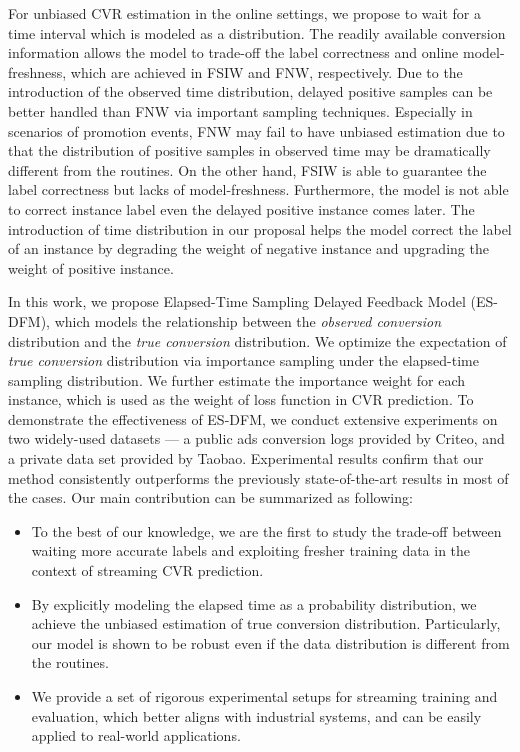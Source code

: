 \documentclass[letterpaper]{article} %
\newcommand{\mus}{Taobao}
\newcommand{\modelname}{Elapsed-Time Sampling Delayed Feedback Model}
\newcommand{\modelnameabb}{ES-DFM}
\begin{document}
For unbiased CVR estimation in the online settings, we propose to wait for a time interval which is modeled as a distribution. The readily available conversion information allows the model to trade-off the label correctness and online model-freshness, which are achieved in FSIW and FNW, respectively. Due to the introduction of the observed time distribution, delayed positive samples can be better handled than FNW via important sampling techniques. Especially in scenarios of promotion events, FNW may fail to have unbiased estimation due to that the distribution of positive samples in observed time may be dramatically different from the routines. On the other hand, FSIW is able to guarantee the label correctness but lacks of model-freshness. Furthermore, the model is not able to correct instance label even the delayed positive instance comes later. The introduction of time distribution in our proposal helps the model correct the label of an instance by degrading the weight of negative instance and upgrading the weight of positive instance.

In this work, we propose \modelname{} (\modelnameabb{}), which models the relationship between the \textit{observed conversion} distribution and the \textit{true conversion} distribution. We optimize the expectation of \textit{true conversion} distribution via importance sampling under the elapsed-time sampling distribution. We further estimate the importance weight for each instance, which is used as the weight of loss function in CVR prediction. To demonstrate the effectiveness of \modelnameabb{}, we conduct extensive experiments on two widely-used datasets --- a public ads conversion logs provided by Criteo, and a private data set provided by \mus. Experimental results confirm that our method consistently outperforms the previously state-of-the-art results in most of the cases. Our main contribution can be summarized as following:

\begin{itemize}
\item{To the best of our knowledge, we are the first to study the trade-off between waiting more accurate labels and exploiting fresher training data in the context of streaming CVR prediction.}

\item{By explicitly modeling the elapsed time as a probability distribution, we achieve the unbiased estimation of true conversion distribution. Particularly, our model is shown to be robust even if the data distribution is different from the routines.}

\item{We provide a set of rigorous experimental setups for streaming training and evaluation, which better aligns with industrial systems, and can be easily applied to real-world applications.}

\end{itemize}
\end{document}
